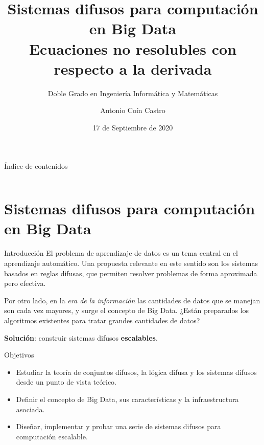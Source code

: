 \documentclass[10pt, spanish]{beamer}
\title{Sistemas difusos para computación en Big Data \\ Ecuaciones no resolubles con respecto a la derivada}
\subtitle{Doble Grado en Ingeniería Informática y Matemáticas}
\date{17 de Septiembre de 2020}
\author{Antonio Coín Castro}
\institute{Trabajo Fin de Grado \\\\\\ \textit{E.T.S de Ingenierías Informática y de Telecomunicación \\ Facultad de Ciencias}}
\begin{document}
\maketitle

\begin{frame}{Índice de contenidos}
  \begin{columns}[t]
    \begin{column}{.5\textwidth}
      \tableofcontents[sections={1}]
    \end{column}
    \begin{column}{.5\textwidth}
      \tableofcontents[sections={2}]
    \end{column}
  \end{columns}
\end{frame}

\section{Sistemas difusos para computación en Big Data}

\begin{frame}{Introducción}
  El problema de aprendizaje de datos es un tema central en el aprendizaje automático. Una propuesta relevante en este sentido son los sistemas basados en reglas difusas, que permiten resolver problemas de forma aproximada pero efectiva.

  Por otro lado, en la \textit{era de la información} las cantidades de datos que se manejan son cada vez mayores, y surge el concepto de Big Data. ¿Están preparados los algoritmos existentes para tratar grandes cantidades de datos?
  \vspace{1em}

  {\color{Maroon}\textbf{Solución}:} construir sistemas difusos \textbf{escalables}.
\end{frame}

\begin{frame}{Objetivos}
\begin{itemize}[<+->]
\item Estudiar la teoría de conjuntos difusos, la lógica difusa y los sistemas difusos desde un punto de vista teórico.
\item Definir el concepto de Big Data, sus características y la infraestructura asociada.
\item Diseñar, implementar y probar una serie de sistemas difusos para computación escalable.
\end{itemize}
\end{frame}
\end{document}
